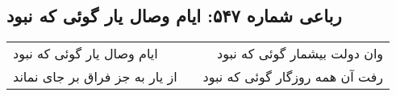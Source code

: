 \begin{center}
\section*{رباعی شماره ۵۴۷: ایام وصال یار گوئی که نبود}
\label{sec:0547}
\begin{longtable}{l p{0.5cm} r}
ایام وصال یار گوئی که نبود
&&
وان دولت بیشمار گوئی که نبود
\\
از یار به جز فراق بر جای نماند
&&
رفت آن همه روزگار گوئی که نبود
\\
\end{longtable}
\end{center}
